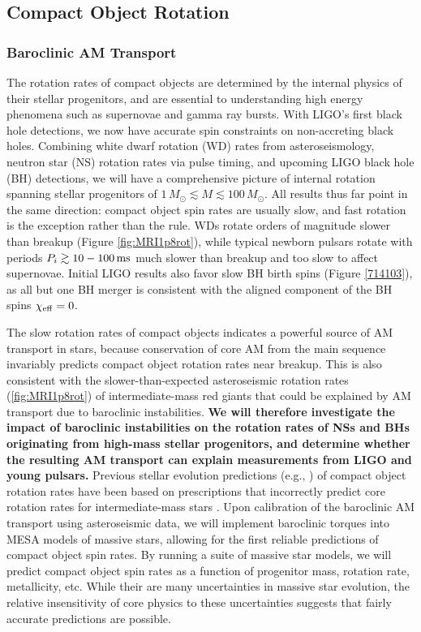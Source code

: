 \subsection{Compact Object Rotation}

\subsubsection{Baroclinic AM Transport}

The rotation rates of compact objects are determined by the internal physics of their stellar progenitors, and are essential to understanding high energy phenomena such as supernovae and gamma ray bursts. With LIGO's first black hole detections, we now have accurate spin constraints on non-accreting black holes. Combining white dwarf rotation (WD) rates from asteroseismology, neutron star (NS) rotation rates via pulse timing, and upcoming LIGO black hole (BH) detections, we will have a comprehensive picture of internal rotation spanning stellar progenitors of $1 \, M_\odot \! \lesssim \! M \! \lesssim \! 100 \, M_\odot$. All results thus far point in the same direction: compact object spin rates are usually slow, and fast rotation is the exception rather than the rule. WDs rotate orders of magnitude slower than breakup (Figure \ref{fig:MRI1p8rot}), while typical newborn pulsars rotate with periods $P_{i} \gtrsim 10-100 \, {\rm ms}$ \citep{faucher:06,igoshev:13,gullon:14} much slower than breakup and too slow to affect  supernovae. Initial LIGO results also favor slow BH birth spins (Figure \ref{714103}), as all but one BH merger is consistent with the aligned component of the BH spins $\chi_{\rm eff} = 0$.


The slow rotation rates of compact objects indicates a powerful source of AM transport in stars, because conservation of core AM from the main sequence invariably predicts compact object rotation rates near breakup. This is also consistent with the slower-than-expected asteroseismic rotation rates (\ref{fig:MRI1p8rot}) of intermediate-mass red giants that could be explained by AM transport due to baroclinic instabilities. {\bf We will therefore investigate the impact of baroclinic instabilities on the rotation rates of NSs and BHs originating from high-mass stellar progenitors, and determine whether the resulting AM transport can explain measurements from LIGO and young pulsars.} Previous stellar evolution predictions (e.g., \citealt{heger:00}) of compact object rotation rates have been based on prescriptions that incorrectly predict core rotation rates for intermediate-mass stars \citep{cantiello:14}. Upon calibration of the baroclinic AM transport using asteroseismic data, we will implement baroclinic torques into MESA models of massive stars, allowing for the first reliable predictions of compact object spin rates. By running a suite of massive star models, we will predict compact object spin rates as a function of progenitor mass, rotation rate, metallicity, etc. While their are many uncertainties in massive star evolution, the relative insensitivity of core physics to these uncertainties suggests that fairly accurate predictions are possible.

